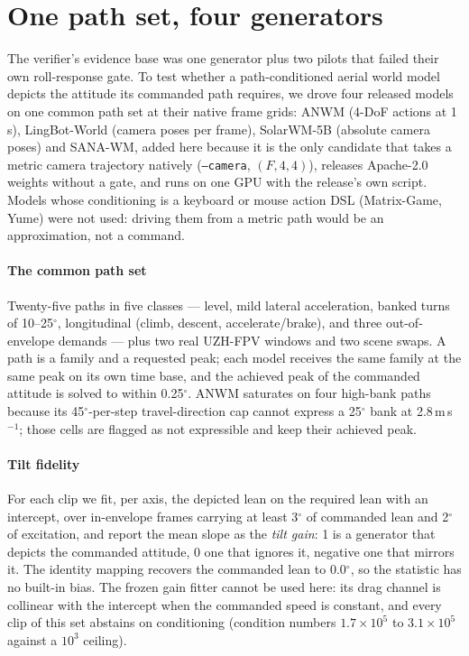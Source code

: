 
\section{One path set, four generators}
\label{sec:x-generators}

The verifier's evidence base was one generator plus two pilots that failed their own roll-response
gate. To test whether a path-conditioned aerial world model depicts the attitude its commanded path
requires, we drove four released models on one common path set at their native frame grids:
ANWM (4-DoF actions at 1\,s), LingBot-World (camera poses per frame), SolarWM-5B (absolute camera
poses) and SANA-WM, added here because it is the only candidate that takes a metric camera
trajectory natively (\texttt{--camera}, $(F,4,4)$), releases Apache-2.0 weights without a gate, and
runs on one GPU with the release's own script. Models whose conditioning is a keyboard or mouse
action DSL (Matrix-Game, Yume) were not used: driving them from a metric path would be an
approximation, not a command.

\paragraph{The common path set}
Twenty-five paths in five classes --- level, mild lateral acceleration, banked turns of 10--25$^\circ$,
longitudinal (climb, descent, accelerate/brake), and three out-of-envelope demands --- plus two
real UZH-FPV windows and two scene swaps. A path is a family and a requested peak; each model
receives the same family at the same peak on its own time base, and the achieved peak of the
commanded attitude is solved to within 0.25$^\circ$. ANWM saturates on four high-bank paths because
its 45$^\circ$-per-step travel-direction cap cannot express a 25$^\circ$ bank at 2.8\,m\,s$^{-1}$;
those cells are flagged as not expressible and keep their achieved peak.

\paragraph{Tilt fidelity}
For each clip we fit, per axis, the depicted lean on the required lean with an intercept, over
in-envelope frames carrying at least 3$^\circ$ of commanded lean and 2$^\circ$ of excitation, and
report the mean slope as the \emph{tilt gain}: 1 is a generator that depicts the commanded attitude,
0 one that ignores it, negative one that mirrors it. The identity mapping recovers the commanded
lean to 0.0$^\circ$, so the statistic has no built-in bias. The frozen gain fitter cannot be used
here: its drag channel is collinear with the intercept when the commanded speed is constant, and
every clip of this set abstains on conditioning (condition numbers $1.7\times10^{5}$ to
$3.1\times10^{5}$ against a $10^{3}$ ceiling).

